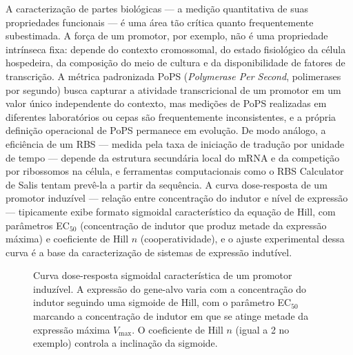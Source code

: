 A caracterização de partes biológicas --- a medição quantitativa de suas propriedades funcionais --- é uma área tão crítica quanto frequentemente subestimada. A força de um promotor, por exemplo, não é uma propriedade intrínseca fixa: depende do contexto cromossomal, do estado fisiológico da célula hospedeira, da composição do meio de cultura e da disponibilidade de fatores de transcrição. A métrica padronizada PoPS (\emph{Polymerase Per Second}, polimerases por segundo) busca capturar a atividade transcricional de um promotor em um valor único independente do contexto, mas medições de PoPS realizadas em diferentes laboratórios ou cepas são frequentemente inconsistentes, e a própria definição operacional de PoPS permanece em evolução. De modo análogo, a eficiência de um RBS --- medida pela taxa de iniciação de tradução por unidade de tempo --- depende da estrutura secundária local do mRNA e da competição por ribossomos na célula, e ferramentas computacionais como o RBS Calculator de Salis tentam prevê-la a partir da sequência. A curva dose-resposta de um promotor induzível --- relação entre concentração do indutor e nível de expressão --- tipicamente exibe formato sigmoidal característico da equação de Hill, com parâmetros EC$_{50}$ (concentração de indutor que produz metade da expressão máxima) e coeficiente de Hill $n$ (cooperatividade), e o ajuste experimental dessa curva é a base da caracterização de sistemas de expressão indutível.

\begin{figure}[htbp]
\centering
{}
\caption{Curva dose-resposta sigmoidal característica de um promotor induzível. A expressão do gene-alvo varia com a concentração do indutor seguindo uma sigmoide de Hill, com o parâmetro EC$_{50}$ marcando a concentração de indutor em que se atinge metade da expressão máxima $V_{\max}$. O coeficiente de Hill $n$ (igual a 2 no exemplo) controla a inclinação da sigmoide.}
\label{fig:14-hill}
\end{figure}


